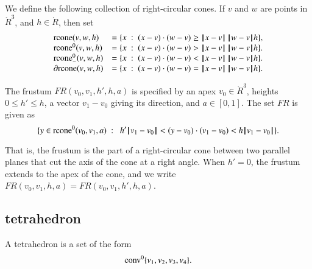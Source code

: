 \begin{definition}[rcone]
We define the following collection of right-circular cones.
If $v$ and $w$ are points in $\ring{R}^3$, and
  $h\in\ring{R}$, then set
  $$\begin{array}{lll}
    \op{rcone}(v,w,h) &= \{x\mid (x-v)\cdot (w-v) \ge \norm{x}{v}\,\norm{w}{v} h\},\\
    \op{rcone}^0(v,w,h) &= \{x\mid (x-v)\cdot (w-v) > \norm{x}{v}\,\norm{w}{v} h\}.\\
    \op{rcone}_-^0(v,w,h) &= \{x\mid (x-v)\cdot (w-v) < \norm{x}{v}\,\norm{w}{v} h\}.\\
    \partial\op{rcone}(v,w,h) &= \{x\mid (x-v)\cdot (w-v) = \norm{x}{v}\,\norm{w}{v} h\}.\\
    \end{array}
    $$
\end{definition}



\begin{definition}[frustum, FR] The frustum
$FR(v_0,v_1,h',h,a)$ is specified by an apex $v_0\in\ring{R}^3$, heights
$0\le h'\le h$, a vector $v_1-v_0$ giving its direction, and
$a\in[0,1]$. The set $FR$ is given as
    $$
    \{ y \in\op{rcone}^0(v_0,v_1,a) \mid \ 
       h'\norm{v_1}{v_0} < (y-v_0) \cdot (v_1-v_0) < h\norm{v_1}{v_0} \}.
    $$
\end{definition}

That is, the frustum is the part of a right-circular cone between two
parallel planes that cut the axis of the cone at a right angle.
When $h'=0$, the frustum extends to the apex of the cone, and
we write $FR(v_0,v_1,h,a)=FR(v_0,v_1,h',h,a)$.

\subsection{tetrahedron}

\begin{definition}[tetrahedron] A tetrahedron is a set of the form
$${\operatorname{conv}}^0\{v_1,v_2,v_3,v_4\}.$$
\end{definition}

